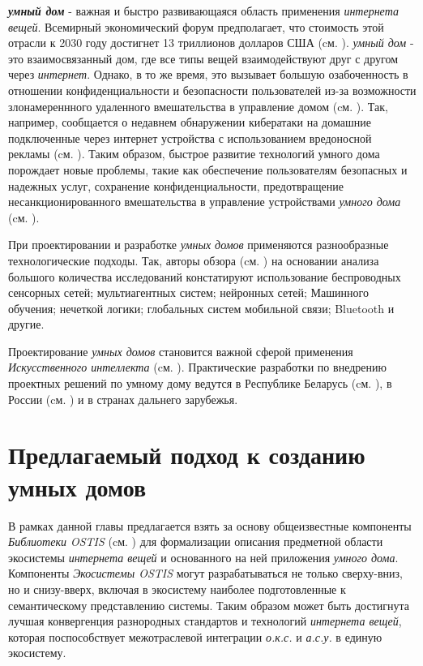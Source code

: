 \textbf{\textit{умный дом}} -  важная и быстро развивающаяся область применения \textit{интернета вещей}. Всемирный экономический форум предполагает, что стоимость этой отрасли к 2030 году достигнет 13 триллионов долларов США (cм. ). \textit{умный дом} - это взаимосвязанный дом, где все типы вещей взаимодействуют друг с другом через \textit{интернет}. Однако, в то же время, это вызывает большую озабоченность в отношении конфиденциальности и безопасности пользователей из-за возможности злонамереннного удаленного вмешательства в управление домом (cм. ). Так, например, сообщается о недавнем обнаружении кибератаки на домашние подключенные через интернет устройства с использованием вредоносной рекламы  (cм. ). Таким образом, быстрое развитие технологий умного дома порождает новые проблемы, такие как обеспечение пользователям безопасных и надежных услуг, сохранение конфиденциальности, предотвращение несанкционированного вмешательства в управление устройствами \textit{умного дома} (cм. ).

При проектировании и разработке \textit{умных домов} применяются разнообразные технологические подходы. Так, авторы обзора (cм. ) на основании анализа большого количества исследований констатируют использование беспроводных сенсорных сетей; мультиагентных систем; нейронных сетей; Машинного обучения; нечеткой логики; глобальных систем мобильной связи; Bluetooth и другие.

Проектирование \textit{умных домов} становится важной сферой применения \textit{Искусственного интеллекта} (cм. ). Практические разработки по внедрению проектных решений по умному дому ведутся в Республике Беларусь (cм. ), в России (cм. ) и в странах дальнего зарубежья.

\section{Предлагаемый подход к созданию умных домов}
\label{sec_proposed_approach_SH}

В рамках данной главы предлагается взять за основу общеизвестные компоненты \textit{Библиотеки OSTIS} (cм. ) для формализации описания предметной области экосистемы \textit{интернета вещей} и основанного на ней приложения \textit{умного дома}. Компоненты \textit{Экосистемы OSTIS} могут разрабатываться не только сверху-вниз, но и снизу-вверх, включая в экосистему наиболее подготовленные к семантическому представлению системы. Таким образом может быть достигнута лучшая конвергенция разнородных стандартов и технологий \textit{интернета вещей}, которая поспособствует межотраслевой интеграции \textit{о.к.с.} и \textit{а.с.у.} в единую экосистему.

